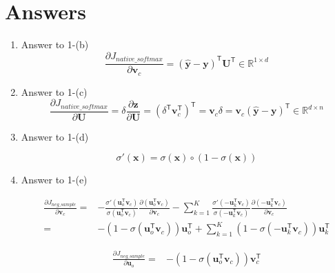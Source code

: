 \documentclass[a4paper]{article}
\begin{document}
\section{Answers}
\begin{enumerate}
	\item 
	Answer to 1-(b)
	\begin{equation}
	\frac{\partial{J_{native\_softmax}}}{\partial{\mathbf{v}_c}}=(\mathbf{\hat{y}-y})^{\mathsf{T}}\mathbf{U}^{\mathsf{T}} \in \mathbb{R}^{1 \times d}
	\end{equation}

	\item 
	Answer to 1-(c)
	\begin{equation}
	\frac{\partial{J_{native\_softmax}}}{\partial{\mathbf{U}}}=\delta \frac{\partial \mathbf{z}}{\partial \mathbf{U}} = (\delta^{\mathsf{T}} \mathbf{v}^{\mathsf{T}}_c)^\mathsf{T}=\mathbf{v}_c \delta = \mathbf{v}_c (\mathbf{\hat{y}-\mathbf{y}})^{\mathsf{T}} \in \mathbb{R}^{d \times n}
	\end{equation}

	\item
	Answer to 1-(d)

	\begin{equation}
	\sigma'(\mathbf{x})=\sigma(\mathbf{x}) \circ (1-\sigma(\mathbf{x}))
	\end{equation}

	\item 
	Answer to 1-(e)

	\begin{equation}
	\begin{split}
	\frac{\partial{J_{neg\_sample}}}{\partial{\mathbf{v}_c}} = &-\frac{\sigma'(\mathbf{u}_o^{\mathsf{T}}\mathbf{v}_c)}{\sigma(\mathbf{u}_o^{\mathsf{T}}\mathbf{v}_c)}\frac{\partial (\mathbf{u}_o^{\mathsf{T}} \mathbf{v}_c)}{\partial \mathbf{v}_c} - \sum_{k=1}^{K}\frac{\sigma'(-\mathbf{u}_k^{\mathsf{T}}\mathbf{v}_c)}{\sigma(-\mathbf{u}_k^{\mathsf{T}}\mathbf{v}_c)}\frac{\partial (-\mathbf{u}_k^{\mathsf{T}} \mathbf{v}_c)}{\partial \mathbf{v}_c}\\
	= & -(1-\sigma(\mathbf{u}_o^{\mathsf{T}}\mathbf{v}_c))\mathbf{u}_o^{\mathsf{T}} + \sum_{k=1}^{K}(1-\sigma(-\mathbf{u}_k^{\mathsf{T}}\mathbf{v}_c))\mathbf{u}_k^{\mathsf{T}}
	\end{split}
	\end{equation}

	\begin{equation}
	\begin{split}
	\frac{\partial{J_{neg\_sample}}}{\partial{\mathbf{u}_o}} = &-(1-\sigma(\mathbf{u}_o^{\mathsf{T}}\mathbf{v}_c))\mathbf{v}_{c}^{\mathsf{T}}
	\end{split}
	\end{equation}


\end{enumerate}
\end{document}
